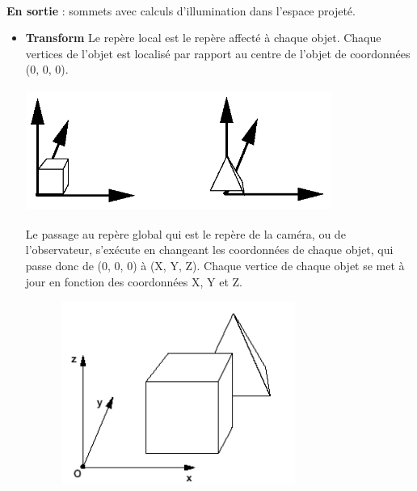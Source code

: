 \textbf{\\En sortie} : sommets avec calculs d’illumination dans l’espace projeté.\\
\begin{itemize}
  \item{\textbf{Transform}}
Le repère local est le repère affecté à chaque objet. Chaque vertices de l’objet est localisé par rapport au centre de l’objet de coordonnées (0, 0, 0).
\\
\begin{center}
\includegraphics[width=10cm,height=40mm]{leo/images/repereLocal.png}
\end{center}

Le passage au repère global qui est le repère de la caméra, ou de l’observateur, s’exécute en changeant les coordonnées de chaque objet, qui passe donc de (0, 0, 0) à (X, Y, Z). Chaque vertice de chaque objet se met à jour en fonction des coordonnées X, Y et Z.
\\
\begin{center}
\includegraphics[width=10cm,height=60mm]{leo/images/repereGlobal.png}\\
\end{center}


\end{itemize}
